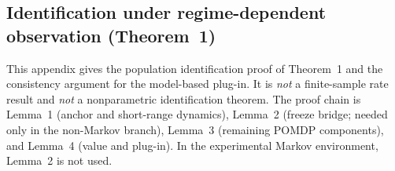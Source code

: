 %
%

\allowdisplaybreaks

\providecommand{\TV}{\mathrm{TV}}

\newtheorem*{aITthm}{Theorem 1}
\newtheorem*{aIlemA}{Lemma 1}
\newtheorem*{aIlemB}{Lemma 2}
\newtheorem*{aIlemC}{Lemma 3}
\newtheorem*{aIlemD}{Lemma 4}

\providecommand{\theHequation}{}
\let\aItheHequation\theHequation
{}
\renewcommand{\theHequation}{aI.\arabic{aIKanchor}}
\newcommand{\aIfixedtag}[1]{\stepcounter{aIKanchor}\tag{#1}}

\subsection{Identification under regime-dependent observation (Theorem~1)}\label{app:a1}

This appendix gives the population identification proof of Theorem~1 and the
consistency argument for the model-based plug-in.  It is \emph{not} a
finite-sample rate result and \emph{not} a nonparametric identification theorem.
The proof chain is Lemma~1 (anchor and short-range dynamics), Lemma~2 (freeze
bridge; needed only in the non-Markov branch), Lemma~3 (remaining POMDP
components), and Lemma~4 (value and plug-in).  In the experimental Markov
environment, Lemma~2 is not used.

